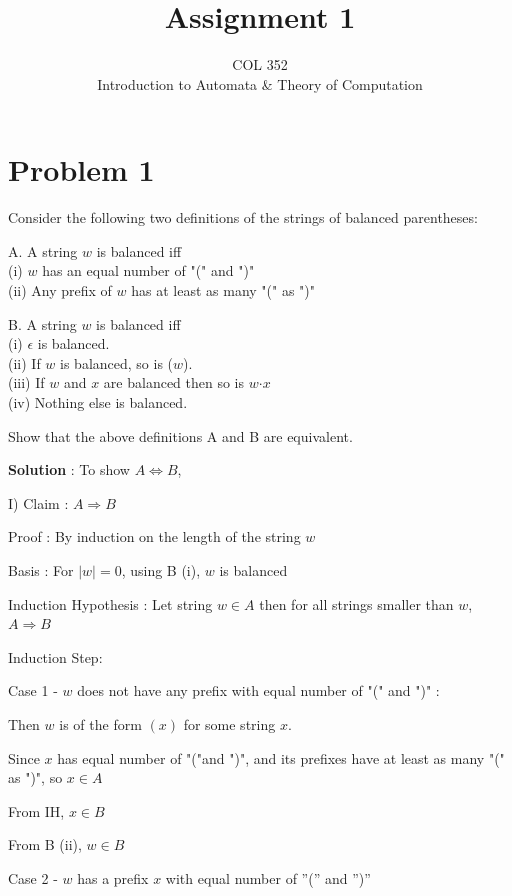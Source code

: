 \documentclass{article}
\title{Assignment 1}
\author{COL 352\\
    Introduction to Automata \& 
    Theory of Computation}
\date{}
\begin{document}
    \maketitle
    
    \section*{Problem 1} Consider the following two definitions of the strings of balanced parentheses:
    
    A. A string $w$ is balanced iff \\
    (i) $w$ has an equal number of "(" and ")"\\
    (ii) Any prefix of $w$ has at least as many "(" as ")"
    
    B. A string $w$ is balanced iff\\
    (i) $\epsilon $ is balanced.\\
    (ii) If $w$ is balanced, so is ($w$).\\
    (iii) If $w$ and $x$ are balanced then so is $w\textrm{·}x$\\
    (iv) Nothing else is balanced.
    
    Show that the above definitions A and B are equivalent.
    
    
    \textbf{Solution} : To show $A \iff B$,
    
    I) Claim : $A \Longrightarrow B$
    
    Proof : By induction on the length of the string $w$
    
    Basis : For $|w| = 0$, using B (i), $w$ is balanced
    
    Induction Hypothesis : Let string $w \in A$ then for all strings smaller than $w$, $A \Longrightarrow B$
    
    Induction Step:
    
    \quad Case 1 - $w$ does not have any prefix with equal number of "(" and ")" : 
    
    \qquad Then $w$ is of the form $( x )$ for some string $x$. 
    
    \qquad Since $x$ has equal number of "("and ")", and its prefixes have at least as many "(" as ")", so $x \in A$
    
    \qquad From IH,  $x \in B$
    
    \qquad From B (ii),  $w \in B$
    
    
    
    \quad Case 2 - $w$ has a prefix $x$ with equal number of ”(” and ”)”
    
\end{document}
